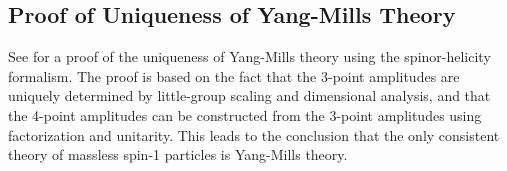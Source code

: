 \subsection{Proof of Uniqueness of Yang-Mills Theory}
\label{subsec:proof-of-uniqueness-of-yang-mills-theory}

See \autocite[Chapter~27.5.2]{schwartzQFT2014} for a proof of the uniqueness of Yang-Mills theory using the spinor-helicity formalism. The proof is based on the fact that the 3-point amplitudes are uniquely determined by little-group scaling and dimensional analysis, and that the 4-point amplitudes can be constructed from the 3-point amplitudes using factorization and unitarity. This leads to the conclusion that the only consistent theory of massless spin-1 particles is Yang-Mills theory.